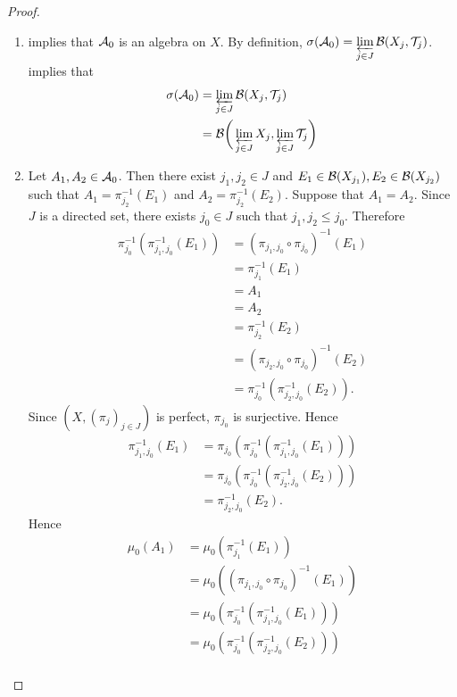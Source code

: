 \documentclass{book}
\begin{document}
\begin{proof}\
	\begin{enumerate}
		\item {} implies that $\mathcal{A}_0$ is an algebra on $X$. By definition, $\sigma(\mathcal{A}_0) = \varprojlim\limits_{j \in J} \mathcal{B}(X_j, \mathcal{T}_j)$.  implies that
		\begin{align*}
			\sigma(\mathcal{A}_0)
			& = \varprojlim\limits_{j \in J} \mathcal{B}(X_j, \mathcal{T}_j) \\
			& = \mathcal{B}\bigg(\varprojlim\limits_{j \in J} X_j, \varprojlim\limits_{j \in J} \mathcal{T}_j  \bigg)
		\end{align*}
		\item Let $A_1, A_2 \in \mathcal{A}_0$. Then there exist $j_1, j_2 \in J$ and $E_1 \in \mathcal{B}(X_{j_1}) , E_2 \in \mathcal{B}(X_{j_2})$ such that $A_1 = \pi_{j_2}^{-1}(E_1)$ and $A_2 = \pi_{j_2}^{-1}(E_2)$. Suppose that $A_1 = A_2$. Since $J$ is a directed set, there exists $j_0 \in J$ such that $j_1, j_2 \leq j_0$. Therefore 
		\begin{align*}
			\pi_{j_0}^{-1}(\pi_{j_1, j_0}^{-1}(E_1)) 
			& = (\pi_{j_1, j_0} \circ \pi_{j_0})^{-1}(E_1) \\
			& = \pi_{j_1}^{-1}(E_1) \\
			& = A_1 \\
			& = A_2 \\
			& = \pi_{j_2}^{-1}(E_2) \\
			& = (\pi_{j_2, j_0} \circ \pi_{j_0})^{-1}(E_2) \\
			& = \pi_{j_0}^{-1}(\pi_{j_2, j_0}^{-1}(E_2)).
		\end{align*}
		Since $(X, (\pi_j)_{j \in J})$ is perfect, $\pi_{j_0}$ is surjective. Hence 
		\begin{align*}
			\pi_{j_1, j_0}^{-1}(E_1)
			& = \pi_{j_0}(\pi_{j_0}^{-1}(\pi_{j_1, j_0}^{-1}(E_1))) \\
			& = \pi_{j_0}(\pi_{j_0}^{-1}(\pi_{j_2, j_0}^{-1}(E_2))) \\
			& = \pi_{j_2, j_0}^{-1}(E_2).
		\end{align*} 
		Hence 
		\begin{align*}
			\mu_0(A_1)
			& = \mu_0(\pi_{j_1}^{-1}(E_1)) \\
			& = \mu_0((\pi_{j_1, j_0} \circ \pi_{j_0})^{-1}(E_1)) \\
			& = \mu_0(\pi_{j_0}^{-1}(\pi_{j_1, j_0}^{-1}(E_1))) \\
			& = \mu_0(\pi_{j_0}^{-1}(\pi_{j_2, j_0}^{-1}(E_2))) \\

\end{align*}
\end{enumerate}
\end{proof}
\end{document}
